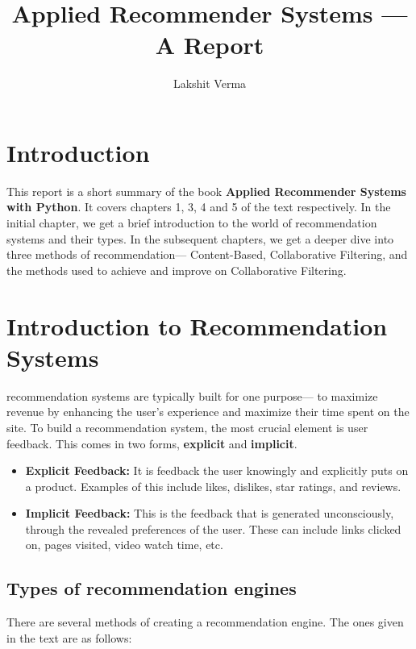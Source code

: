 \documentclass{article}
\title{Applied Recommender Systems — A Report}
\author{Lakshit Verma}
\begin{document}
\maketitle
\tableofcontents
\newpage

\section{Introduction}

This report is a short summary of the book \textbf{Applied Recommender Systems with Python}. It covers chapters 1, 3, 4 and 5 of the text respectively. In the initial chapter, we get a brief introduction to the world of recommendation systems and their types. In the subsequent chapters, we get a deeper dive into three methods of recommendation— Content-Based, Collaborative Filtering, and the methods used to achieve and improve on Collaborative Filtering.

\section{Introduction to Recommendation Systems}

recommendation systems are typically built for one purpose— to maximize revenue by enhancing the user's experience and maximize their time spent on the site.
To build a recommendation system, the most crucial element is user feedback. This comes in two forms, \textbf{explicit} and \textbf{implicit}.

\begin{itemize}

    \item{\textbf{Explicit Feedback:} It is feedback the user knowingly and explicitly puts on a product. Examples of this include likes, dislikes, star ratings, and reviews.}
    \item{\textbf{Implicit Feedback:} This is the feedback that is generated unconsciously, through the revealed preferences of the user. These can include links clicked on, pages visited, video watch time, etc.}

\end{itemize}

\subsection{Types of recommendation engines}

There are several methods of creating a recommendation engine. The ones given in the text are as follows:
\end{document}
